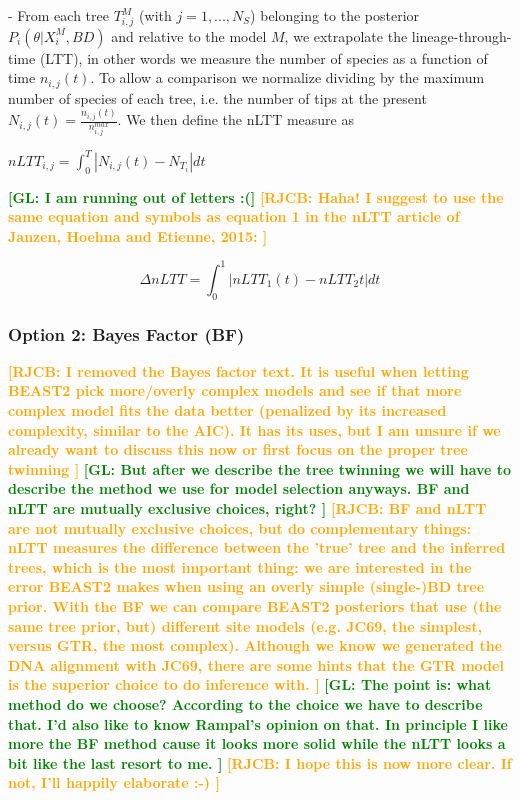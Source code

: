 \documentclass{article}
\newcommand*\richel[1]{\textcolor{orange}{\textbf{[RJCB: #1]}}}
\newcommand*\gio[1]{\textcolor{green}{\textbf{[GL: #1]}}}
\begin{document}
\begin{itemize}
- From each tree $T_{i,j}^{M}$ (with $j=1,...,N_{S}$) 
  belonging to the posterior $P_{i}(\theta | X^{M}_{i}, BD)$ 
  and relative to the model $M$, we extrapolate the lineage-through-time (LTT), 
  in other words we measure the number of species as a function of 
  time $n_{i,j}(t)$. To allow a comparison we normalize dividing by the 
  maximum number of species of each tree, i.e. the number of tips at the 
  present $N_{i,j}(t)=\frac{n_{i,j}(t)}{n^{max}_{i,j}}$. We then define the 
  nLTT measure as

$nLTT_{i,j} = \int_{0}^{T} | N_{i,j}(t) - N_{T_{i}} | dt$

\gio{I am running out of letters :(}
\richel{Haha! I suggest to use the same equation and symbols 
  as equation 1 in
  the nLTT article of Janzen, Hoehna and Etienne, 2015:
}

$$
\Delta nLTT = \int_{0}^{1} | nLTT_1(t) - nLTT_2{t} | dt
$$

\subsubsection{Option 2: Bayes Factor (BF)}

\richel{
  I removed the Bayes factor text. It is useful when letting BEAST2
  pick more/overly complex models and see if that more complex model fits the
  data better (penalized by its increased complexity, similar to the AIC). It has
  its uses, but I am unsure if we already want to discuss this now
  or first focus on the proper tree twinning
}
\gio{
  But after we describe the tree twinning we will have to describe 
  the method we use for model selection anyways. 
  BF and nLTT are mutually exclusive choices, right?
}
\richel{
  BF and nLTT are not mutually exclusive choices, but do complementary things:
  nLTT measures the difference between the 'true' tree and the inferred trees,
  which is the most important thing: we are interested in the error BEAST2
  makes when using an overly simple (single-)BD tree prior.
  With the BF we can compare BEAST2 posteriors that use (the same
  tree prior, but) different site models (e.g. JC69, the simplest, 
  versus GTR, the most complex). Although we know we generated the DNA
  alignment with JC69, there are some hints that the GTR model is the
  superior choice to do inference with.
}
\gio{
  The point is: what method do we choose? 
  According to the choice we have to describe that. 
  I'd also like to know Rampal's opinion on that. 
  In principle I like more the BF method cause it looks 
  more solid while the nLTT looks a bit like the last resort to me.
}
\richel{
  I hope this is now more clear. If not, I'll happily
  elaborate :-)
}

\end{itemize}
\end{document}
